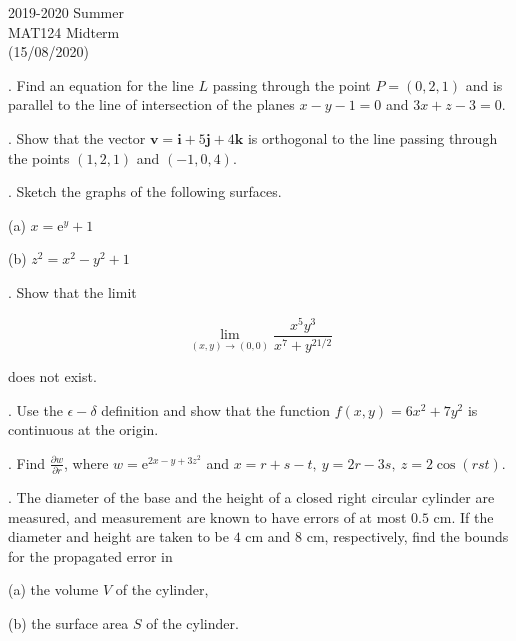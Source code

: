 \documentclass{article}
\begin{document}
\pagestyle{empty}
\large

\begin{center}
2019-2020 Summer \\MAT124 Midterm\\(15/08/2020)
\end{center}

. Find an equation for the line $L$ passing through the point $P=(0,2,1)$ and is parallel to the line of intersection of the planes $x-y-1=0$ and $3x+z-3=0$.

\hfill

. Show that the vector $\mathbf{v}=\mathbf{i}+5\mathbf{j}+4\mathbf{k}$ is orthogonal to the line passing through the points $(1,2,1)$ and $(-1,0,4)$.

\hfill

. Sketch the graphs of the following surfaces.

\hfill

\noindent (a) $x=\mathrm{e}^y+1$

\hfill

\noindent (b) $z^2=x^2-y^2+1$

\hfill

. Show that the limit

\[\lim_{(x,y)\to(0,0)}\frac{x^5y^3}{x^7+y^{21/2}}\]

\hfill

\noindent does not exist.

\hfill

. Use the $\epsilon-\delta$ definition and show that the function $f(x,y)=6x^2+7y^2$ is continuous at the origin.

\hfill

. Find $\displaystyle\frac{\partial w}{\partial r}$, where $w=\mathrm{e}^{2x-y+3z^2}$ and $x=r+s-t,\:y=2r-3s,\:z=2\cos(rst)$.

\hfill

. The diameter of the base and the height of a closed right circular cylinder are measured, and measurement are known to have errors of at most $0.5$ cm. If the diameter and height are taken to be $4$ cm and $8$ cm, respectively, find the bounds for the propagated error in

\hfill

\noindent (a) the volume $V$ of the cylinder,

\hfill

\noindent (b) the surface area $S$ of the cylinder.
\end{document}
